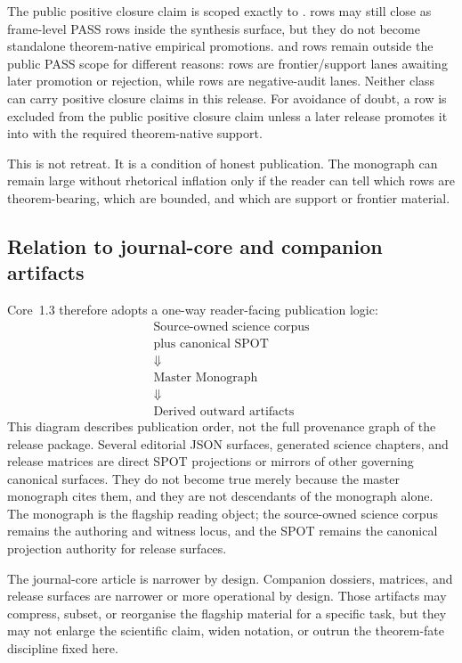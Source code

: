 The public positive closure claim is scoped exactly to
.  rows may still close as
frame-level PASS rows inside the synthesis surface, but they do not become
standalone theorem-native empirical promotions.  and
 rows remain outside the public PASS scope for different
reasons:  rows are frontier/support lanes awaiting later
promotion or rejection, while  rows are negative-audit lanes.
Neither class can carry positive closure claims in this release.
For avoidance of doubt, a   row is excluded
from the public positive closure claim unless a later release promotes it into
 with the required theorem-native support.

This is not retreat. It is a condition of honest publication. The monograph
can remain large without rhetorical inflation only if the reader can tell which
rows are theorem-bearing, which are bounded, and which are support or frontier
material.

\subsection{Relation to journal-core and companion artifacts}

Core~1.3 therefore adopts a one-way reader-facing publication logic:
\[
\begin{gathered}
\text{Source-owned science corpus}\\
\text{plus canonical SPOT}\\
\Downarrow\\
\text{Master Monograph}\\
\Downarrow\\
\text{Derived outward artifacts}
\end{gathered}
\]
This diagram describes publication order, not the full provenance graph of
the release package. Several editorial JSON surfaces, generated science
chapters, and release matrices are direct SPOT projections or mirrors of other
governing canonical surfaces. They do not become true merely because the
master monograph cites them, and they are not descendants of the monograph
alone. The monograph is the flagship reading object; the source-owned science
corpus remains the authoring and witness locus, and the SPOT remains the canonical
projection authority for release surfaces.

The journal-core article is narrower by design. Companion dossiers, matrices,
and release surfaces are narrower or more operational by design. Those
artifacts may compress, subset, or reorganise the flagship material for a
specific task, but they may not enlarge the scientific claim, widen notation,
or outrun the theorem-fate discipline fixed here.

